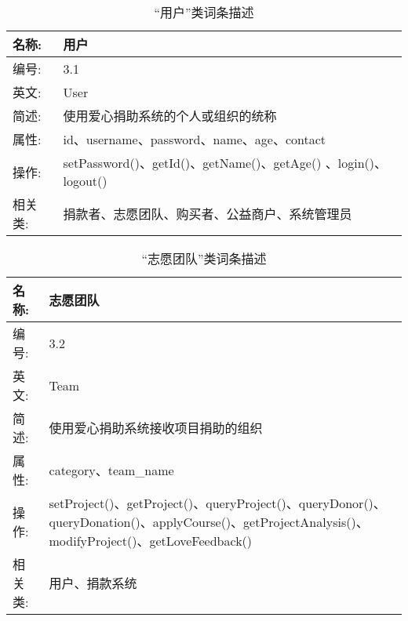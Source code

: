 \begin{table}[H]  
\caption{“用户”类词条描述}  
\begin{center}  
    \begin{tabular}{l p{11cm}} 
        \hline
        \quad 名称:  &  用户 \\
        \hline
        \quad 编号:  & 3.1 \\
        \hline
        \quad 英文:  &  User \\
        \hline
        \quad 简述:  & 使用爱心捐助系统的个人或组织的统称 \\
        \hline
        \quad 属性:  & id、username、password、name、age、contact \\
        \hline
        \quad 操作:  & setPassword()、getId()、getName()、getAge() 、login()、logout() \\
        \hline
        \quad 相关类:  & 捐款者、志愿团队、购买者、公益商户、系统管理员 \\
        \hline
    \end{tabular}
\end{center}
\end{table}

\begin{table}[H]  
\caption{“志愿团队”类词条描述}  
\begin{center}  
    \begin{tabular}{l p{11cm}} 
        \hline
        \quad 名称:  &  志愿团队 \\
        \hline
        \quad 编号:  & 3.2 \\
        \hline
        \quad 英文:  &  Team \\
        \hline
        \quad 简述:  & 使用爱心捐助系统接收项目捐助的组织 \\
        \hline
        \quad 属性:  & category、team\_name \\
        \hline 
        \quad 操作:  & setProject()、getProject()、queryProject()、queryDonor()、queryDonation()、applyCourse()、getProjectAnalysis()、modifyProject()、getLoveFeedback()\\
        \hline
        \quad 相关类:  & 用户、捐款系统 \\
        \hline
    \end{tabular}
\end{center}
\end{table}

